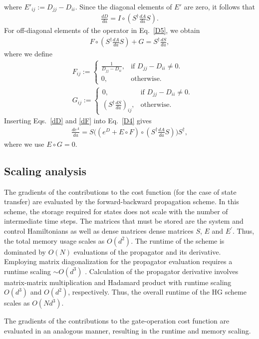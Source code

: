 where $E'_{ij}:=D_{jj}-D_{ii}$. 
Since the diagonal elements of $E'$ are zero, it follows that
\begin{align}
\label{dD}
    \frac{dD}{da}=I\circ (S^\dagger\frac{dA}{da}S).
\end{align}
For off-diagonal elements of the operator in Eq.\ \eqref{D5}, we obtain
\begin{align}
\label{dF}
    F\circ (S^\dagger\frac{dA}{da}S)+G=S^\dagger\frac{dS}{da},
\end{align}
where we define 
\begin{align}
    &F_{ij}:=
  \begin{cases}
    \frac{1}{D_{jj}-D_{ii}},& \text{if $D_{jj}-D_{ii} \neq 0$}.\\
    0, & \text{otherwise}.
  \end{cases}\\
\nonumber  &G_{ij}:=
  \begin{cases}
    0, & \text{if $D_{jj}-D_{ii} \neq 0$}.\\
    (S^\dagger\frac{dS}{da})_{ij}, & \text{otherwise}.
\end{cases}
\end{align}
Inserting Eqs.\ \eqref{dD} and \eqref{dF} into Eq.\ \eqref{D4} gives
\begin{align}
\label{propagator der}
    \frac{de^A}{da}=S\big((e^D+E \circ F)\circ(S^\dagger \frac{dA}{da}S)\big)S^\dagger,
\end{align}
where we use $E\circ G=0$. 
\subsection{Scaling analysis }
The gradients of the contributions to the cost function (for the case of state transfer) are evaluated by the forward-backward propagation scheme. In this scheme, the storage required for states does not scale with the number of intermediate time steps. The matrices that must be stored are the system and control Hamiltonians as well as dense matrices dense matrices $S$, $E$ and $E^\prime$. Thus, the total memory usage scales as $O(d^2)$. The runtime of the scheme is dominated by $O(N)$ evaluations of the propagator and its derivative. Employing matrix diagonalization for the propagator evaluation requires a runtime scaling $\sim O(d^3)$ \cite{matridiagcomppan1999complexity}. Calculation of the propagator derivative involves matrix-matrix multiplication and Hadamard product with runtime scaling $O(d^3)$ and $O(d^2)$, respectively. Thus, the overall runtime of the HG scheme scales as $O(Nd^3)$. 

The gradients of the contributions to the gate-operation cost function are evaluated in an analogous manner, resulting in the runtime and memory scaling.




